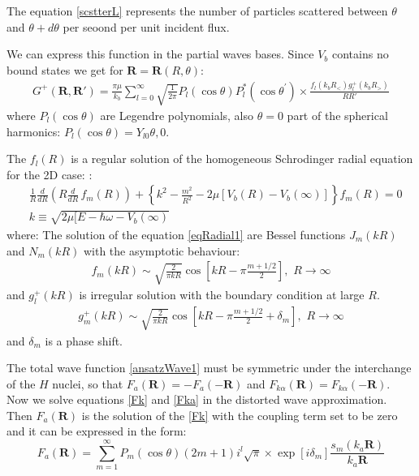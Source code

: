 The equation \eqref{scstterL} represents the number of particles scattered between $ \theta $ and $ \theta + d\theta $ per seoond per unit incident flux.

We can express this function in the partial waves bases. Since $ V_b $ contains no bound states we get for $ \mathbf{R} = \mathbf{R}(R,\theta) $:
\begin{equation}\label{GreenFka2}
\begin{split}
G^{+}(\mathbf{R}, \mathbf{R}') =  \frac{\pi\mu}{k_b}\sum_{l=0}^{\infty}{\sqrt{\frac{1}{2\pi}} P_l(\cos\theta) P_l^{*}(\cos\theta^{'})}\times \frac{f_l(k_bR_{<})g^{+}_l(k_bR_{>})}{RR'}
\end{split}
\end{equation}
where $ P_l(\cos\theta) $ are Legendre polynomials, also $ \theta = 0 $ part of the spherical harmonics:  $ P_l(\cos\theta) = Y_{l0}{\theta,0} $. 

The $ f_l(R) $ is a regular solution of the homogeneous Schrodinger radial  equation for the 2D case: \cite{H2atom}:
\begin{equation}\label{eqRadial1}
\begin{split}
  & \frac{1}{R}\frac{d}{dR}\left(R \frac{d}{dR}\,f_m(R)\right) + \left\{k^2 - \frac{m^2}{R^2} - 2\mu\left[V_b(R) - V_b(\infty)\right] \right\}f_m(R) = 0 \\[.8em]
& k \equiv \sqrt{2\mu[E - \hbar\omega - V_b(\infty)}
\end{split}
\end{equation}
where:
The solution of the equation \eqref{eqRadial1} are Bessel functions $ J_m(kR) $ and $ N_m(kR) $ with the asymptotic behaviour:
\begin{equation}
\begin{split}
f_{m}(kR)\sim \sqrt{\frac{2}{\pi kR}}\cos\left[kR - \pi\frac{m+1/2}{2} \right],\,\,{R \rightarrow \infty}
\end{split}
\end{equation}
and $ g^{+}_l(kR) $ is irregular solution with the boundary condition at large $ R $.
\begin{equation}\label{remoteWave}
\begin{split}
g^{+}_{m}{(kR)} \sim \sqrt{\frac{2}{\pi kR}}\cos\left[kR - \pi\frac{m+1/2}{2} + \delta_m\right],\,\,{R \rightarrow \infty}
\end{split}
\end{equation}
and $  \delta_m $ is a phase shift. 

The total wave function \eqref{ansatzWave1} must be symmetric under the interchange of the $ H $ nuclei, so that $ F_a(\mathbf{R}) = -F_a(-\mathbf{R}) $ and $ F_{k\alpha}(\mathbf{R}) =  F_{k\alpha}(-\mathbf{R}) $. Now we solve equations \eqref{Fk} and \eqref{Fka} in the distorted wave approximation. Then $ F_a(\mathbf{R}) $ is the solution of the \eqref{Fk} with the coupling term set to be zero and it can be expressed in the form:
\begin{equation}\label{Flong1}
F_a(\mathbf{R}) = \sum_{m=1}^{\infty}{P_m(\cos\theta)(2m+1)i^{l}\sqrt{\pi}\times \exp[i\delta_m]\frac{s_m(k_a\mathbf{R})}{k_a\mathbf{R} } } 
\end{equation}

